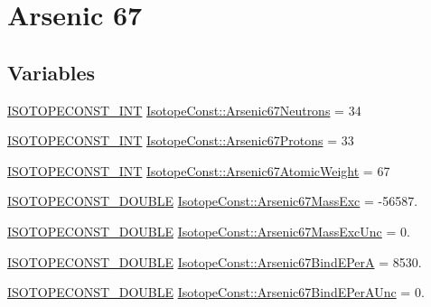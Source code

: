 \hypertarget{group___isotope_const-_arsenic-_as67}{}\section{Arsenic 67}
\label{group___isotope_const-_arsenic-_as67}
\subsection*{Variables}
\begin{DoxyCompactItemize}
\item 
\mbox{\hyperlink{group___isotope_const-_macros_ga5f18360b3e99483a35c32d789e62621c}{I\+S\+O\+T\+O\+P\+E\+C\+O\+N\+S\+T\+\_\+\+I\+NT}} \mbox{\hyperlink{group___isotope_const-_arsenic-_as67_gadef966777ced58274c9d26b258e6a94a}{Isotope\+Const\+::\+Arsenic67\+Neutrons}} = 34
\item 
\mbox{\hyperlink{group___isotope_const-_macros_ga5f18360b3e99483a35c32d789e62621c}{I\+S\+O\+T\+O\+P\+E\+C\+O\+N\+S\+T\+\_\+\+I\+NT}} \mbox{\hyperlink{group___isotope_const-_arsenic-_as67_gaa54abc0d0df768e6e73d94b8d709f975}{Isotope\+Const\+::\+Arsenic67\+Protons}} = 33
\item 
\mbox{\hyperlink{group___isotope_const-_macros_ga5f18360b3e99483a35c32d789e62621c}{I\+S\+O\+T\+O\+P\+E\+C\+O\+N\+S\+T\+\_\+\+I\+NT}} \mbox{\hyperlink{group___isotope_const-_arsenic-_as67_ga68fc1ed209c33ec598dcdf5850f11881}{Isotope\+Const\+::\+Arsenic67\+Atomic\+Weight}} = 67
\item 
\mbox{\hyperlink{group___isotope_const-_macros_ga8f45a7272ce02c0b4c65c44636ed719a}{I\+S\+O\+T\+O\+P\+E\+C\+O\+N\+S\+T\+\_\+\+D\+O\+U\+B\+LE}} \mbox{\hyperlink{group___isotope_const-_arsenic-_as67_gafcc8e29127e3d0ddb684fe415dfa182d}{Isotope\+Const\+::\+Arsenic67\+Mass\+Exc}} = -\/56587.
\item 
\mbox{\hyperlink{group___isotope_const-_macros_ga8f45a7272ce02c0b4c65c44636ed719a}{I\+S\+O\+T\+O\+P\+E\+C\+O\+N\+S\+T\+\_\+\+D\+O\+U\+B\+LE}} \mbox{\hyperlink{group___isotope_const-_arsenic-_as67_ga4121901adeade5459f1bff65196f6a4f}{Isotope\+Const\+::\+Arsenic67\+Mass\+Exc\+Unc}} = 0.
\item 
\mbox{\hyperlink{group___isotope_const-_macros_ga8f45a7272ce02c0b4c65c44636ed719a}{I\+S\+O\+T\+O\+P\+E\+C\+O\+N\+S\+T\+\_\+\+D\+O\+U\+B\+LE}} \mbox{\hyperlink{group___isotope_const-_arsenic-_as67_ga6e76a7e8b6a4ecb19e66b3c68af34c67}{Isotope\+Const\+::\+Arsenic67\+Bind\+E\+PerA}} = 8530.
\item 
\mbox{\hyperlink{group___isotope_const-_macros_ga8f45a7272ce02c0b4c65c44636ed719a}{I\+S\+O\+T\+O\+P\+E\+C\+O\+N\+S\+T\+\_\+\+D\+O\+U\+B\+LE}} \mbox{\hyperlink{group___isotope_const-_arsenic-_as67_ga32051d64e79e0dcda26b9d96eb20d391}{Isotope\+Const\+::\+Arsenic67\+Bind\+E\+Per\+A\+Unc}} = 0.

\end{DoxyCompactItemize}
